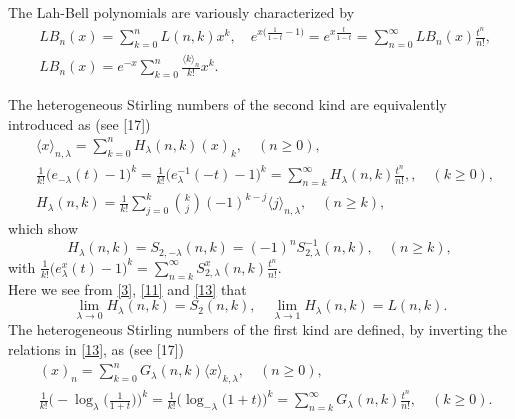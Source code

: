 \documentclass[a4paper,11pt]{amsart}
\begin{document}
The Lah-Bell polynomials are variously characterized by
\begin{equation} \label{12}
\begin{aligned}
&LB_{n}(x)=\sum_{k=0}^{n}L(n,k)x^{k}, \quad
e^{x\big(\frac{1}{1-t}-1\big)}=e^{x\frac{t}{1-t}}=\sum_{n=0}^{\infty}LB_{n}(x)\frac{t^{n}}{n!}, \\
&LB_{n}(x)=e^{-x}\sum_{k=0}^{n}\frac{\langle k \rangle_{n}}{k!} x^{k}.
\end{aligned}
\end{equation} \par
The heterogeneous Stirling numbers of the second kind are equivalently introduced as  (see [17])
\begin{equation} \label{13}
\begin{aligned}
&\langle x \rangle_{n,\lambda}=\sum_{k=0}^{n}H_{\lambda}(n,k)(x)_{k},  \quad (n \ge 0),\\
&\frac{1}{k!}\big(e_{-\lambda}(t)-1\big)^{k}=\frac{1}{k!}\big(e_{\lambda}^{-1}(-t)-1\big)^{k}=\sum_{n=k}^{\infty}H_{\lambda}(n,k)\frac{t^{n}}{n!}, ,\quad (k \ge 0),\\
&H_{\lambda}(n,k)=\frac{1}{k!}\sum_{j=0}^{k}\binom{k}{j}(-1)^{k-j}\langle j \rangle_{n,\lambda}, \quad(n \ge k),
\end{aligned}
\end{equation}
which show 
\begin{equation*} 
H_{\lambda}(n,k)=S_{2,-\lambda}(n,k)=(-1)^{n}S_{2,\lambda}^{-1}(n,k),\quad (n \ge k),
\end{equation*}
with $\frac{1}{k!}\big(e_{\lambda}^{x}(t)-1\big)^{k}=\sum_{n=k}^{\infty}S_{2,\lambda}^{x}(n,k)\frac{t^{n}}{n!}$. \\
Here we see  from \eqref{3}, \eqref{11} and \eqref{13} that 
\begin{equation*}
\lim_{\lambda \rightarrow 0}H_{\lambda}(n,k)=S_{2}(n,k), \quad
\lim_{\lambda \rightarrow 1}H_{\lambda}(n,k)=L(n,k).
\end{equation*}
The heterogeneous Stirling numbers of the first kind are defined, by inverting the relations in \eqref{13}, as (see [17])
\begin{equation} \label{14}
\begin{aligned}
&(x)_{n}=\sum_{k=0}^{n}G_{\lambda}(n,k)\langle x \rangle_{k,\lambda}, \quad (n \ge 0),\\
&\frac{1}{k!}\Big(-\log_{\lambda}\Big(\frac{1}{1+t}\Big)\Big)^{k}=\frac{1}{k!}\Big(\log_{-\lambda}\big(1+t \big)\Big)^{k}=\sum_{n=k}^{\infty}G_{\lambda}(n,k)\frac{t^{n}}{n!},\quad (k \ge 0).
\end{aligned}
\end{equation}
\end{document}
